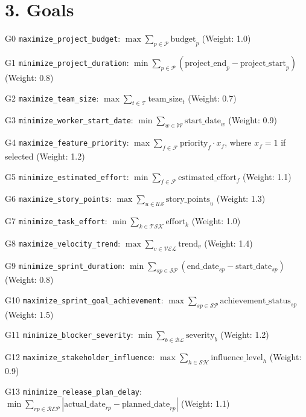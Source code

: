 \documentclass[12pt]{article}
\begin{document}
\section{3. Goals}
\item[G0] \texttt{maximize\_project\_budget}: $\max \sum_{p \in \mathcal{P}} \text{budget}_p$ \hfill (Weight: 1.0)
    \item[G1] \texttt{minimize\_project\_duration}: $\min \sum_{p \in \mathcal{P}} (\text{project\_end}_p - \text{project\_start}_p)$ \hfill (Weight: 0.8)
    \item[G2] \texttt{maximize\_team\_size}: $\max \sum_{t \in \mathcal{T}} \text{team\_size}_t$ \hfill (Weight: 0.7)
    \item[G3] \texttt{minimize\_worker\_start\_date}: $\min \sum_{w \in \mathcal{W}} \text{start\_date}_w$ \hfill (Weight: 0.9)
    \item[G4] \texttt{maximize\_feature\_priority}: $\max \sum_{f \in \mathcal{F}} \text{priority}_f \cdot x_f$, where $x_f = 1$ if selected \hfill (Weight: 1.2)
    \item[G5] \texttt{minimize\_estimated\_effort}: $\min \sum_{f \in \mathcal{F}} \text{estimated\_effort}_f$ \hfill (Weight: 1.1)
    \item[G6] \texttt{maximize\_story\_points}: $\max \sum_{u \in \mathcal{US}} \text{story\_points}_u$ \hfill (Weight: 1.3)
    \item[G7] \texttt{minimize\_task\_effort}: $\min \sum_{k \in \mathcal{TSK}} \text{effort}_k$ \hfill (Weight: 1.0)
    \item[G8] \texttt{maximize\_velocity\_trend}: $\max \sum_{v \in \mathcal{VEL}} \text{trend}_v$ \hfill (Weight: 1.4)
    \item[G9] \texttt{minimize\_sprint\_duration}: $\min \sum_{sp \in \mathcal{SP}} (\text{end\_date}_{sp} - \text{start\_date}_{sp})$ \hfill (Weight: 0.8)
    \item[G10] \texttt{maximize\_sprint\_goal\_achievement}: $\max \sum_{sp \in \mathcal{SP}} \text{achievement\_status}_{sp}$ \hfill (Weight: 1.5)
    \item[G11] \texttt{minimize\_blocker\_severity}: $\min \sum_{b \in \mathcal{BL}} \text{severity}_b$ \hfill (Weight: 1.2)
    \item[G12] \texttt{maximize\_stakeholder\_influence}: $\max \sum_{h \in \mathcal{SH}} \text{influence\_level}_h$ \hfill (Weight: 0.9)
    \item[G13] \texttt{minimize\_release\_plan\_delay}: $\min \sum_{rp \in \mathcal{REP}} |\text{actual\_date}_{rp} - \text{planned\_date}_{rp}|$ \hfill (Weight: 1.1)
\end{document}
